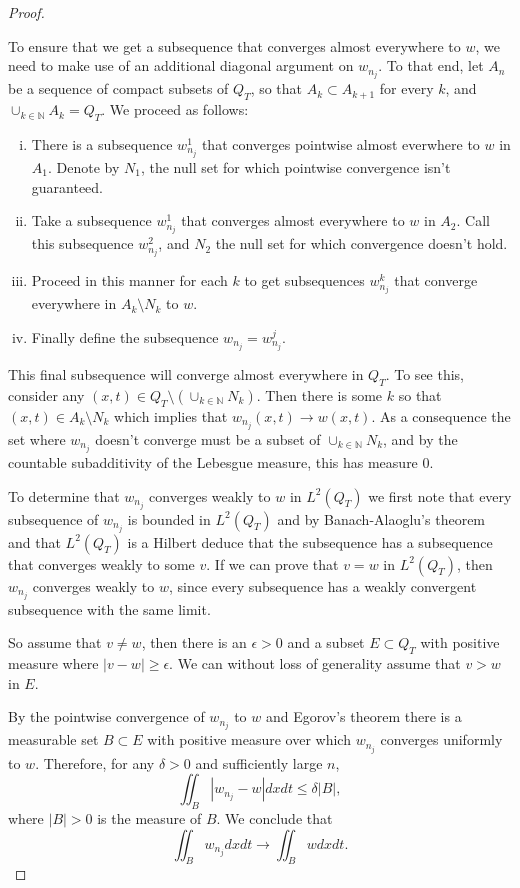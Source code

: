 \documentclass[11pt, a4paper]{article}
\begin{document}
\begin{proof}
\begin{enumerate}[i)]
\end{enumerate}	 
	To ensure that we get a subsequence that converges almost everywhere to $w$, we need to make use of an additional diagonal argument on $w_{n_j}$. To that end, let $A_n$ be a sequence of compact subsets of $Q_T$, so that $A_k \subset A_{k+1}$ for every $k$, and $\cup_{k \in \mathbb{N}}A_k = Q_T$. We proceed as follows:
	\begin{enumerate}[i)]
		\item There is a subsequence $w_{n_j}^1$ that converges pointwise almost everwhere to $w$ in $A_1$. Denote by $N_1$, the null set for which pointwise convergence isn't guaranteed.
		\item Take a subsequence $w_{n_j}^1$ that converges almost everywhere to $w$ in $A_2$. Call this subsequence $w_{n_j}^2$, and $N_2$ the null set for which convergence doesn't hold.
		
		\item Proceed in this manner for each $k$ to get subsequences $w_{n_j}^k$ that converge everywhere in $A_k \setminus N_k$ to $w$.

		\item Finally define the subsequence $w_{n_j} = w_{n_j}^j$.	
	\end{enumerate}
	This final subsequence will converge almost everywhere in $Q_T$. To see this, consider any $(x,t) \in Q_T \setminus \left( \cup_{k \in \mathbb{N}}N_k \right)$. Then there is some $k$ so that $(x,t) \in A_k\setminus N_k$ which implies that $w_{n_j}(x,t) \to w(x,t)$. As a consequence the set where $w_{n_j}$ doesn't converge must be a subset of $\cup_{k\in \mathbb{N}} N_k$, and by the countable subadditivity of the Lebesgue measure, this has measure $0$.

	To determine that $w_{n_j}$ converges weakly to $w$ in $L^2(Q_T)$ we first note that every subsequence of $w_{n_j}$ is bounded in $L^2(Q_T)$ and by Banach-Alaoglu's theorem and that $L^2(Q_T)$ is a Hilbert deduce that the subsequence has a subsequence that converges weakly to some $v$. If we can prove that $v=w$ in $L^2(Q_T)$, then $w_{n_j}$ converges weakly to $w$, since every subsequence has a weakly convergent subsequence with the same limit.
	
	So assume that $v\neq w$, then there is an $\epsilon > 0$ and a subset $E\subset Q_T$ with positive measure where $|v-w| \geq \epsilon$. We can without loss of generality assume that $v > w$ in $E$.
	
	By the pointwise convergence of $w_{n_j}$ to $w$ and Egorov's theorem \citep[p. 120]{weiss1999course}	
	there is a measurable set $B\subset E$ with positive measure over which $w_{n_j}$ converges uniformly to $w$. Therefore, for any $\delta > 0$ and sufficiently large $n$,
	\begin{equation*}
	\iint_B |w_{n_j}-w|dxdt \leq \delta |B|,
	\end{equation*}
	where $|B|>0$ is the measure of $B$. We conclude that
	\begin{equation*}
	\iint_B w_{n_j}dxdt \to \iint_B wdxdt.
	\end{equation*}
	

\end{proof}
\end{document}
